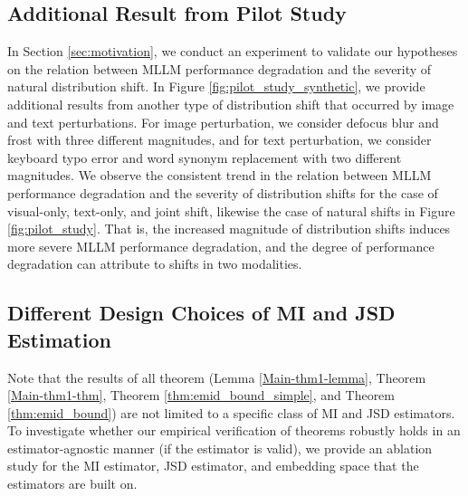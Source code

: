 \subsection{Additional Result from Pilot Study}
In Section \ref{sec:motivation}, we conduct an experiment to validate our hypotheses on the relation between MLLM performance degradation and the severity of natural distribution shift. In Figure \ref{fig:pilot_study_synthetic}, we provide additional results from another type of distribution shift that occurred by image and text perturbations. For image perturbation, we consider defocus blur and frost with three different magnitudes, and for text perturbation, we consider keyboard typo error and word synonym replacement with two different magnitudes. We observe the consistent trend in the relation between MLLM performance degradation and the severity of distribution shifts for the case of visual-only, text-only, and joint shift, likewise the case of natural shifts in Figure \ref{fig:pilot_study}. That is, the increased magnitude of distribution shifts induces more severe MLLM performance degradation, and the degree of performance degradation can attribute to shifts in two modalities.

\subsection{Different Design Choices of MI and JSD Estimation} Note that the results of all theorem (Lemma \ref{Main-thm1-lemma}, Theorem \ref{Main-thm1-thm}, Theorem \ref{thm:emid_bound_simple}, and Theorem \ref{thm:emid_bound}) are not limited to a specific class of MI and JSD estimators. To investigate whether our empirical verification of theorems robustly holds in an estimator-agnostic manner (if the estimator is valid), we provide an ablation study for the  MI estimator, JSD estimator, and embedding space that the estimators are built on. 

